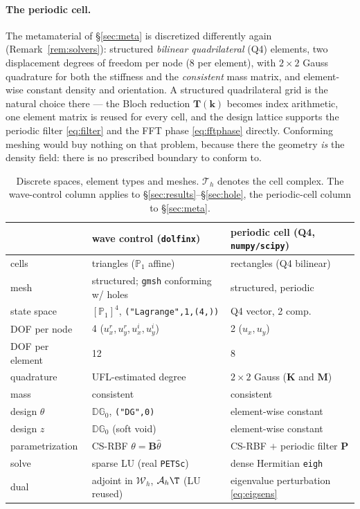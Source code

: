 \documentclass[11pt]{article}
\begin{document}
\paragraph{The periodic cell.} The metamaterial of \S\ref{sec:meta} is discretized
differently again (Remark~\ref{rem:solvers}): structured \emph{bilinear
quadrilateral} (Q4) elements, two displacement degrees of freedom per node
(8 per element), with $2\times2$ Gauss quadrature for both the stiffness and the
\emph{consistent} mass matrix, and element-wise constant density and orientation.
A structured quadrilateral grid is the natural choice there --- the Bloch
reduction $\mathbf T(\mathbf k)$ becomes index arithmetic, one element matrix is
reused for every cell, and the design lattice supports the periodic filter
\eqref{eq:filter} and the FFT phase \eqref{eq:fftphase} directly. Conforming
meshing would buy nothing on that problem, because there the geometry \emph{is}
the density field: there is no prescribed boundary to conform to.

\begin{table}[h]
\centering\small
\caption{Discrete spaces, element types and meshes. $\mathcal T_h$ denotes the
cell complex. The wave-control column applies to
\S\ref{sec:results}--\S\ref{sec:hole}, the periodic-cell column to
\S\ref{sec:meta}.}
\label{tab:spaces}
\begin{tabular}{lll}
\toprule
& wave control (\texttt{dolfinx}) & periodic cell (Q4, \texttt{numpy/scipy})\\
\midrule
cells & triangles ($\mathbb P_1$ affine) & rectangles (Q4 bilinear)\\
mesh & structured; \texttt{gmsh} conforming w/ holes & structured, periodic\\
state space & $[\mathbb P_1]^4$, \texttt{("Lagrange",1,(4,))} & Q4 vector, 2 comp.\\
DOF per node & 4 ($u^r_x,u^r_y,u^i_x,u^i_y$) & 2 ($u_x,u_y$)\\
DOF per element & 12 & 8\\
quadrature & UFL-estimated degree & $2\times2$ Gauss ($\mathbf K$ and $\mathbf M$)\\
mass & consistent & consistent\\
design $\theta$ & $\mathbb{DG}_0$, \texttt{("DG",0)} & element-wise constant\\
design $z$ & $\mathbb{DG}_0$ (soft void) & element-wise constant\\
parametrization & CS-RBF $\theta=\mathbf B\hat\theta$ &
  CS-RBF $+$ periodic filter $\mathbf P$\\
solve & sparse LU (real \texttt{PETSc}) & dense Hermitian \texttt{eigh}\\
dual & adjoint in $\mathcal W_h$, $\mathcal A_h\T$ (LU reused)
      & eigenvalue perturbation \eqref{eq:eigsens}\\
\bottomrule
\end{tabular}
\end{table}
\end{document}
